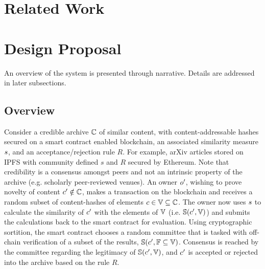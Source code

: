 \documentclass[conference]{IEEEtran}
\begin{document}
\section{Related Work}
\section{Design Proposal}
An overview of the system is presented through narrative. Details are addressed in later subsections. 
\subsection{Overview}\label{overview}
Consider a credible archive ${{\mathbb{C}}}$ of similar content, with content-addressable hashes secured on a smart contract enabled blockchain, an associated similarity measure ${s}$, and an acceptance/rejection rule $R$. For example, arXiv articles stored on IPFS with community defined $s$ and $R$ secured by Ethereum. Note that credibility is a consensus amongst peers and not an intrinsic property of the archive (e.g. scholarly peer-reviewed venues). An owner ${o}^\prime$,  wishing to prove novelty of content ${c}^\prime \notin {{\mathbb{C}}}$, makes a transaction on the blockchain and receives a random subset of content-hashes of elements ${c} \in {\mathbb{V}} \subseteq {{\mathbb{C}}}$. The owner now uses ${s}$ to calculate the similarity of ${c}^\prime$ with the elements of ${\mathbb{V}}$ (i.e. ${\mathbb{S}}({c}^\prime, {\mathbb{V}})$) and submits the calculations back to the smart contract for evaluation. Using cryptographic sortition, the smart contract chooses a random committee that is tasked with off-chain verification of a subset of the results, ${\mathbb{S}}({c}^\prime, {\mathbb{F}} \subseteq {\mathbb{V}})$. Consensus is reached by the committee regarding the legitimacy of ${\mathbb{S}}({c}^\prime, {\mathbb{V}})$, and ${c}^\prime$ is accepted or rejected into the archive based on the rule $R$.

\end{document}

